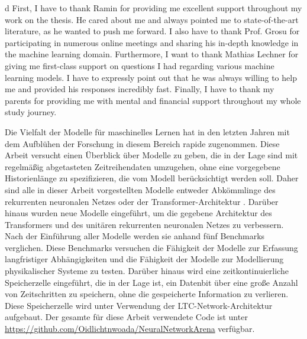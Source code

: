 \documentclass[draft,final]{vutinfth} %
\begin{document}
    \frontmatter %


    \AddStatementPage


    \begin{acknowledgements*}
        d
        First, I have to thank Ramin for providing me excellent support throughout my work on the thesis.
        He cared about me and always pointed me to state-of-the-art literature, as he wanted to push me forward.
        I also have to thank Prof. Grosu for participating in numerous online meetings and sharing his in-depth knowledge in the machine learning domain.
        Furthermore, I want to thank Mathias Lechner for giving me first-class support on questions I had regarding various machine learning models.
        I have to expressly point out that he was always willing to help me and provided his responses incredibly fast.
        Finally, I have to thank my parents for providing me with mental and financial support throughout my whole study journey.
    \end{acknowledgements*}

    \begin{kurzfassung}
        Die Vielfalt der Modelle für maschinelles Lernen hat in den letzten Jahren mit dem Aufblühen der Forschung in diesem Bereich rapide zugenommen.
        Diese Arbeit versucht einen Überblick über Modelle zu geben, die in der Lage sind mit regelmäßig abgetasteten Zeitreihendaten umzugehen, ohne eine vorgegebene Historienlänge zu spezifizieren, die vom Modell berücksichtigt werden soll.
        Daher sind alle in dieser Arbeit vorgestellten Modelle entweder Abkömmlinge des rekurrenten neuronalen Netzes oder der Transformer-Architektur \cite{Transformer}.
        Darüber hinaus wurden neue Modelle eingeführt, um die gegebene Architektur des Transformers \cite{Transformer} und des unitären rekurrenten neuronalen Netzes \cite{EfficientUnitaryRNNs} zu verbessern.
        Nach der Einführung aller Modelle werden sie anhand fünf Benchmarks verglichen.
        Diese Benchmarks versuchen die Fähigkeit der Modelle zur Erfassung langfristiger Abhängigkeiten und die Fähigkeit der Modelle zur Modellierung physikalischer Systeme zu testen.
        Darüber hinaus wird eine zeitkontinuierliche Speicherzelle eingeführt, die in der Lage ist, ein Datenbit über eine große Anzahl von Zeitschritten zu speichern, ohne die gespeicherte Information zu verlieren.
        Diese Speicherzelle wird unter Verwendung der LTC-Network-Architektur \cite{LTCNetworks} aufgebaut.
        Der gesamte für diese Arbeit verwendete Code ist unter \url{https://github.com/Oidlichtnwoada/NeuralNetworkArena} verfügbar.
    \end{kurzfassung}
\end{document}
